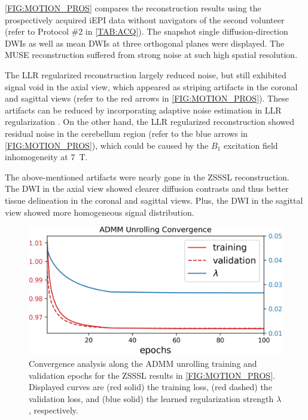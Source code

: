 \documentclass[journal,twoside,web]{ieeecolor}
\begin{document}
	\cref{FIG:MOTION_PROS} compares the reconstruction results
	using the prospectively acquired iEPI data without navigators
	of the second volunteer
	(refer to Protocol \#2 in \cref{TAB:ACQ}).
	The snapshot single diffusion-direction DWIs
	as well as mean DWIs
	at three orthogonal planes were displayed.
	The MUSE reconstruction suffered from strong noise
	at such high spatial resolution.

	The LLR regularized reconstruction largely reduced noise,
	but still exhibited signal void in the axial view,
	which appeared as striping artifacts in the coronal and sagittal views
	(refer to the red arrows in \cref{FIG:MOTION_PROS}).
	These artifacts can be reduced by incorporating adaptive noise estimation
	in LLR regularization \cite{cordero_2019_cplxdwi}.
	On the other hand, the LLR regularized reconstruction
	showed residual noise in the cerebellum region
	(refer to the blue arrows in \cref{FIG:MOTION_PROS}),
	which could be caused by the $B_1$ excitation field inhomogeneity
	at \SI{7}{\tesla}.

	The above-mentioned artifacts were nearly gone in the ZSSSL reconstruction.
	The DWI in the axial view showed clearer diffusion contrasts
	and thus better tissue delineation in the coronal and sagittal views.
	Plus, the DWI in the sagittal view showed more homogeneous
	signal distribution.

	\begin{figure}
		\centering
		\includegraphics[width=\columnwidth]{../figures/fig5.png}
		\caption{Convergence analysis along the ADMM unrolling training
			and validation epochs
			for the ZSSSL results in \cref{FIG:MOTION_PROS}.
			Displayed curves are (red solid) the training loss,
			(red dashed) the validation loss,
			and (blue solid) the learned regularization strength $\lambda$, respectively.}
		\label{FIG:CONVERGENCE}
	\end{figure}
\end{document}

